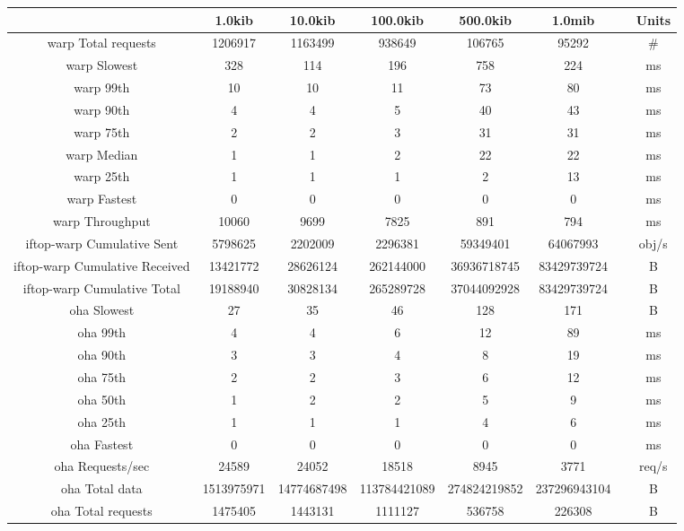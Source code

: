 \begin{sidewaystable}
	\begin{tabular}{|c|c|c|c|c|c|c|c|}
		\hline
		& 1.0kib & 10.0kib & 100.0kib & 500.0kib & 1.0mib &  & Units \\
		\hline
		warp Total requests & 1206917 & 1163499 & 938649 & 106765 & 95292 &  & \# \\
		\hline
		warp Slowest & 328 & 114 & 196 & 758 & 224 &  & ms \\
		\hline
		warp 99th & 10 & 10 & 11 & 73 & 80 &  & ms \\
		\hline
		warp 90th & 4 & 4 & 5 & 40 & 43 &  & ms \\
		\hline
		warp 75th & 2 & 2 & 3 & 31 & 31 &  & ms \\
		\hline
		warp Median & 1 & 1 & 2 & 22 & 22 &  & ms \\
		\hline
		warp 25th & 1 & 1 & 1 & 2 & 13 &  & ms \\
		\hline
		warp Fastest & 0 & 0 & 0 & 0 & 0 &  & ms \\
		\hline
		warp Throughput & 10060 & 9699 & 7825 & 891 & 794 &  & ms \\
		\hline
		iftop-warp Cumulative Sent & 5798625 & 2202009 & 2296381 & 59349401 & 64067993 &  & obj/s \\
		\hline
		iftop-warp Cumulative Received & 13421772 & 28626124 & 262144000 & 36936718745 & 83429739724 &  & B \\
		\hline
		iftop-warp Cumulative Total & 19188940 & 30828134 & 265289728 & 37044092928 & 83429739724 &  & B \\
		\hline
		oha Slowest & 27 & 35 & 46 & 128 & 171 &  & B \\
		\hline
		oha 99th & 4 & 4 & 6 & 12 & 89 &  & ms \\
		\hline
		oha 90th & 3 & 3 & 4 & 8 & 19 &  & ms \\
		\hline
		oha 75th & 2 & 2 & 3 & 6 & 12 &  & ms \\
		\hline
		oha 50th & 1 & 2 & 2 & 5 & 9 &  & ms \\
		\hline
		oha 25th & 1 & 1 & 1 & 4 & 6 &  & ms \\
		\hline
		oha Fastest & 0 & 0 & 0 & 0 & 0 &  & ms \\
		\hline
		oha Requests/sec & 24589 & 24052 & 18518 & 8945 & 3771 &  & req/s \\
		\hline
		oha Total data & 1513975971 & 14774687498 & 113784421089 & 274824219852 & 237296943104 &  & B \\
		\hline
		oha Total requests & 1475405 & 1443131 & 1111127 & 536758 & 226308 &  & B \\

\end{tabular}
\end{sidewaystable}
